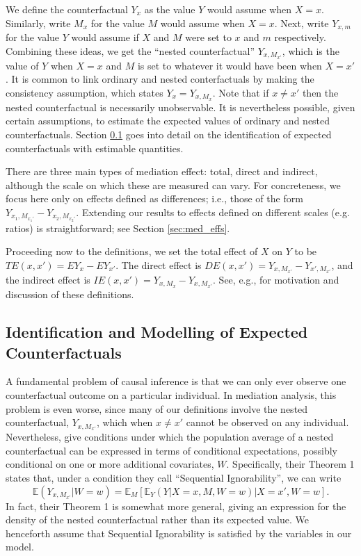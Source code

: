 \documentclass{article}
\newcommand{\bE}{\mathbb{E}}
\begin{document}
We define the counterfactual $Y_x$ as the value $Y$ would assume when $X=x$. Similarly, write $M_x$ for the value $M$ would assume when $X=x$. Next, write $Y_{x,m}$ for the value $Y$ would assume if $X$ and $M$ were set to $x$ and $m$ respectively. Combining these ideas, we get the ``nested counterfactual'' $Y_{x, M_{x'}}$, which is the value of $Y$ when $X=x$ and $M$ is set to whatever it would have been when $X=x'$. It is common to link ordinary and nested conterfactuals by making the consistency assumption, which states $Y_x = Y_{x, M_x}$. Note that if $x \neq x'$ then the nested counterfactual is necessarily unobservable. It is nevertheless possible, given certain assumptions, to estimate the expected values of ordinary and nested counterfactuals. Section \ref{sec:ID} goes into detail on the identification of expected counterfactuals with estimable quantities.

There are three main types of mediation effect: total, direct and indirect, although the scale on which these are measured can vary. For concreteness, we focus here only on effects defined as differences; i.e., those of the form $Y_{x_1, M_{x_1'}} - Y_{x_2, M_{x_2'}}$. Extending our results to effects defined on different scales (e.g. ratios) is straightforward; see Section \ref{sec:med_effs}.

Proceeding now to the definitions, we set the total effect of $X$ on $Y$ to be $TE(x, x') = EY_x - EY_{x'}$. The direct effect is $DE(x, x') = Y_{x, M_{x'}} - Y_{x', M_{x'}}$, and the indirect effect is $IE(x, x') = Y_{x, M_{x}} - Y_{x, M_{x'}}$. See, e.g., \citet{Pea12} for motivation and discussion of these definitions.





\subsection{Identification and Modelling of Expected Counterfactuals}
\label{sec:ID}

A fundamental problem of causal inference is that we can only ever observe one counterfactual outcome on a particular individual. In mediation analysis, this problem is even worse, since many of our definitions involve the nested counterfactual, $Y_{x, M_{x'}}$, which when $x \neq x'$ cannot be observed on any individual. Nevertheless, \citet{Ima10I} give conditions under which the population average of a nested counterfactual can be expressed in terms of conditional expectations, possibly conditional on one or more additional covariates, $W$. Specifically, their Theorem 1 states that, under a condition they call ``Sequential Ignorability'', we can write
%
\begin{equation}
    \bE (Y_{x, M_{x'}} | W=w) = \bE_M \left[ \bE_Y \left( Y | X=x, M, W=w \right) | X=x', W=w \right]. \label{eq:ID}
\end{equation}
%
In fact, their Theorem 1 is somewhat more general, giving an expression for the density of the nested counterfactual rather than its expected value. We henceforth assume that Sequential Ignorability is satisfied by the variables in our model.
\end{document}
